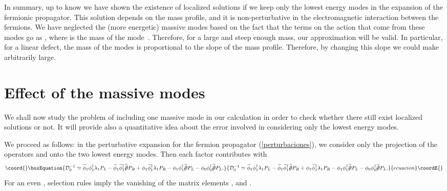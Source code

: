 \documentclass[a4paper,12pt]{article}
\begin{document}
{{In summary, up to know we have shown the existence of localized
solutions if we keep only the lowest energy modes in the expansion of
the fermionic propagator. This solution depends on the mass profile,
and it is non-perturbative in the electromagnetic interaction between
the fermions.  We have neglected the (more energetic) massive modes
based on the fact that the terms on the action that come from these
modes go as \coordHE{}, where \coordHE{} is the mass of
the mode~\cite{p1}. Therefore, for a large and steep enough mass, our
approximation will be valid. In particular, for a linear defect, the
mass of the modes is proportional to the slope of the mass profile.
Therefore, by changing this slope we could make \coordHE{}
arbitrarily large.

\section{Effect of the massive modes}\label{disc}
We shall now study the problem of including one massive mode in our
calculation in order to check whether there still exist localized
solutions or not.  It will provide also a quantitative idea about the
error involved in considering only the lowest energy modes.

We proceed as follows: in the perturbative expansion for the fermion
propagator (\ref{perturbaciones}), we consider only the projection of
the operators \coordHE{} and \coordHE{} onto the two
lowest energy modes. Then each factor \coordHE{}
contributes with
 \begin{equation}\coord{}\boxEquation{
{\mathcal D}_0^{-1} \simeq \widetilde{\phi}_1\phi^{\dagger}_1
\lambda_1 P_L - \widetilde{\phi}_1 \widetilde{\phi}^{\dagger}_1
\widehat{/\!\!\!\partial} P_R + \phi_1
\widetilde{\phi}^{\dagger}_1 \lambda_1 P_R - \phi_1
\phi^{\dagger}_1 \widehat{/\!\!\!\partial} P_L -
\phi_0\phi^{\dagger}_0 \widehat{/\!\!\!\partial} P_L
\label{ordencero}.
}{
{\mathcal D}_0^{-1} \simeq \widetilde{\phi}_1\phi^{\dagger}_1
\lambda_1 P_L - \widetilde{\phi}_1 \widetilde{\phi}^{\dagger}_1
\widehat{/\!\!\!\partial} P_R + \phi_1
\widetilde{\phi}^{\dagger}_1 \lambda_1 P_R - \phi_1
\phi^{\dagger}_1 \widehat{/\!\!\!\partial} P_L -
\phi_0\phi^{\dagger}_0 \widehat{/\!\!\!\partial} P_L
.
}{ecuacion}\coordE{}\end{equation}
For an even \coordHE{}, selection rules imply the vanishing of the
matrix elements \coordHE{}, \coordHE{} and \coordHE{}.

}}
\end{document}
